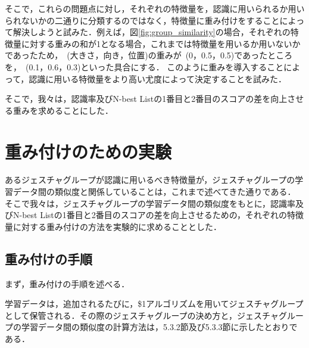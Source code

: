 そこで，これらの問題点に対し，それぞれの特徴量を，認識に用いられるか用いられないかの二通りに分類するのではなく，特徴量に重み付けをすることによって解決しようと試みた．例えば，図\ref{fig:group_similarity}の場合，それぞれの特徴量に対する重みの和が1となる場合，これまでは特徴量を用いるか用いないかであったため，~(大きさ，向き，位置)の重みが~(0，0.5，0.5)であったところを，~(0.1，0.6，0.3)といった具合にする．
このように重みを導入することによって，認識に用いる特徴量をより高い尤度によって決定することを試みた．

そこで，我々は，認識率及びN-best Listの1番目と2番目のスコアの差を向上させる重みを求めることにした．


\section{重み付けのための実験}
あるジェスチャグループが認識に用いるべき特徴量が，ジェスチャグループの学習データ間の類似度と関係していることは，これまで述べてきた通りである．
そこで我々は，ジェスチャグループの学習データ間の類似度をもとに，認識率及びN-best Listの1番目と2番目のスコアの差を向上させるための，それぞれの特徴量に対する重み付けの方法を実験的に求めることとした．

\subsection{重み付けの手順}
まず，重み付けの手順を述べる．

学習データは，追加されるたびに，\$1アルゴリズムを用いてジェスチャグループとして保管される．その際のジェスチャグループの決め方と，ジェスチャグループの学習データ間の類似度の計算方法は，5.3.2節及び5.3.3節に示したとおりである．

